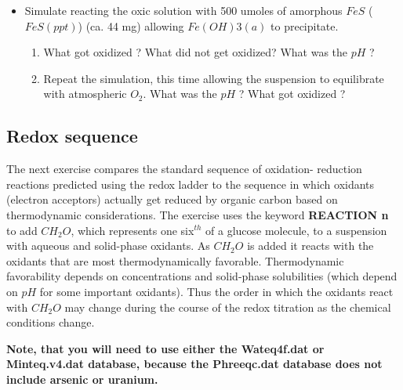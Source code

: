 \begin{itemize}
\begin{enumerate}
	\end{enumerate} 
\item Simulate reacting the oxic solution with 500 umoles of amorphous $FeS$ ($FeS(ppt)$) (ca. 44 mg) allowing $Fe(OH)3(a)$ to precipitate. 
	\begin{enumerate}  
	\item What got oxidized ? What did not get oxidized? What was the $pH$ ?
	\item Repeat the simulation, this time allowing the suspension to equilibrate with atmospheric $O_2$. What was the $pH$ ? What got oxidized ?
	\end{enumerate}  
\end{itemize} 


\subsection[Redox sequence]{Redox sequence}

The next exercise compares the standard sequence of oxidation- reduction reactions 
predicted using the redox ladder to the sequence in which oxidants (electron acceptors) 
actually get reduced by organic carbon based on thermodynamic considerations.   
The exercise uses the keyword {\color{red} \textbf{REACTION n}} to add $CH_2O$, 
which represents one six$^{th}$ of a glucose molecule, to a suspension with aqueous and solid-phase oxidants.  
As $CH_2O$ is added it reacts with the oxidants that are most thermodynamically favorable. 
Thermodynamic favorability depends on concentrations and solid-phase solubilities 
(which depend on $pH$ for some important oxidants).  
Thus the order in which the oxidants react with $CH_2O$ may change during the course 
of the redox titration as the chemical conditions change.  

\textbf{Note, that you will need to use either the {\color{red} \textbf{Wateq4f.dat}} 
or {\color{red} \textbf{Minteq.v4.dat}} database, 
because the Phreeqc.dat database does not include arsenic or uranium.}


